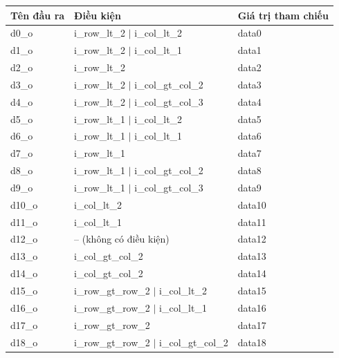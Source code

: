 \begin{table}[H]
    \centering
    \renewcommand{\arraystretch}{1.3}
    \begin{tabular}{|p{2.2cm} p{7cm} p{4cm}|}
        \hline
        \rowcolor{gray!30}
        \textbf{Tên đầu ra} & \textbf{Điều kiện} & \textbf{Giá trị tham chiếu} \\
        \hline
        d0\_o  & i\_row\_lt\_2 $\vert$ i\_col\_lt\_2         & data0  \\ \hline
        d1\_o  & i\_row\_lt\_2 $\vert$ i\_col\_lt\_1         & data1  \\ \hline
        d2\_o  & i\_row\_lt\_2                                & data2  \\ \hline
        d3\_o  & i\_row\_lt\_2 $\vert$ i\_col\_gt\_col\_2     & data3  \\ \hline
        d4\_o  & i\_row\_lt\_2 $\vert$ i\_col\_gt\_col\_3     & data4  \\ \hline
        d5\_o  & i\_row\_lt\_1 $\vert$ i\_col\_lt\_2         & data5  \\ \hline
        d6\_o  & i\_row\_lt\_1 $\vert$ i\_col\_lt\_1         & data6  \\ \hline
        d7\_o  & i\_row\_lt\_1                                & data7  \\ \hline
        d8\_o  & i\_row\_lt\_1 $\vert$ i\_col\_gt\_col\_2     & data8  \\ \hline
        d9\_o  & i\_row\_lt\_1 $\vert$ i\_col\_gt\_col\_3     & data9  \\ \hline
        d10\_o & i\_col\_lt\_2                                & data10 \\ \hline
        d11\_o & i\_col\_lt\_1                                & data11 \\ \hline
        d12\_o & -- (không có điều kiện)                     & data12 \\ \hline
        d13\_o & i\_col\_gt\_col\_2                           & data13 \\ \hline
        d14\_o & i\_col\_gt\_col\_2                           & data14 \\ \hline
      d15\_o & i\_row\_gt\_row\_2 $\vert$ i\_col\_lt\_2     & data15 \\ \hline
      d16\_o & i\_row\_gt\_row\_2 $\vert$ i\_col\_lt\_1     & data16 \\ \hline
      d17\_o & i\_row\_gt\_row\_2                           & data17 \\ \hline
      d18\_o & i\_row\_gt\_row\_2 $\vert$ i\_col\_gt\_col\_2 & data18 \\ \hline

\end{tabular}
\end{table}
